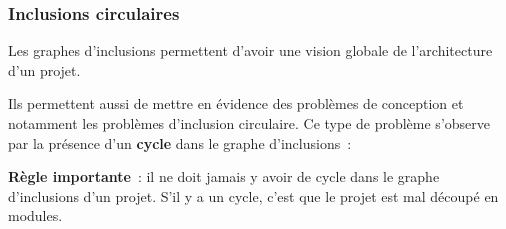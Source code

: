 \begin{frame}[fragile]
\frametitle{Inclusions circulaires}
Les graphes d'inclusions permettent d'avoir une vision globale de
l'architecture d'un projet.
\bigskip

Ils permettent aussi de mettre en évidence des problèmes de conception
et notamment les problèmes d'\alert{inclusion circulaire}. Ce type de
problème s'observe par la présence d'un {\bf cycle} dans le graphe
d'inclusions~:
\begin{center}
\end{center}
\medskip

{\bf Règle importante}~: il ne doit jamais y avoir de cycle dans le
graphe d'inclusions d'un projet. S'il y a un cycle, c'est que le projet
est mal découpé en modules.
\end{frame}

